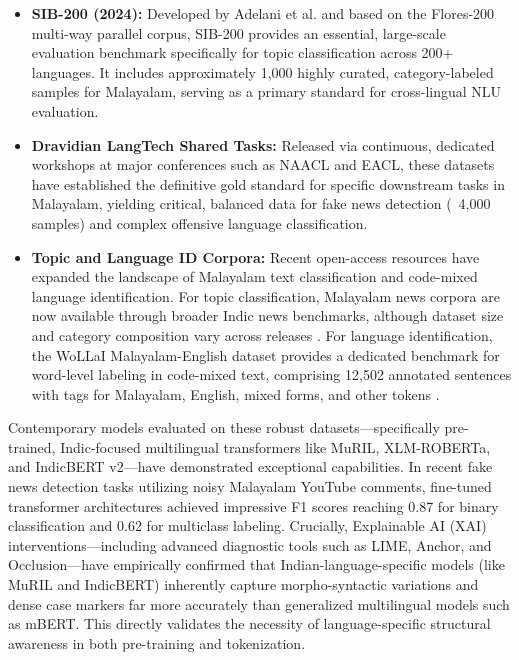 \documentclass[12pt]{article}
\begin{document}
	\begin{itemize}
		\item \textbf{SIB-200 (2024):} Developed by Adelani et al. and based on the Flores-200 multi-way parallel corpus, SIB-200 provides an essential, large-scale evaluation benchmark specifically for topic classification across 200+ languages. It includes approximately 1,000 highly curated, category-labeled samples for Malayalam, serving as a primary standard for cross-lingual NLU evaluation. \cite{adelani2023sib200}
		
		\item \textbf{Dravidian LangTech Shared Tasks:} Released via continuous, dedicated workshops at major conferences such as NAACL and EACL, these datasets have established the definitive gold standard for specific downstream tasks in Malayalam, yielding critical, balanced data for fake news detection (~4,000 samples)\cite{farsi2024dravidian_fakenews_dataset} and complex offensive language classification.\cite{dravidianlangtech2024_fakenews} 
		
		\item \textbf{Topic and Language ID Corpora:} Recent open-access resources have expanded the landscape of Malayalam text classification and code-mixed language identification. For topic classification, Malayalam news corpora are now available through broader Indic news benchmarks, although dataset size and category composition vary across releases \cite{palanikumar2024l3cubeindicnews}. For language identification, the WoLLaI Malayalam-English dataset provides a dedicated benchmark for word-level labeling in code-mixed text, comprising 12{,}502 annotated sentences with tags for Malayalam, English, mixed forms, and other tokens \cite{rijuraj2023wollai}.
	\end{itemize}
	Contemporary models evaluated on these robust datasets—specifically pre-trained, Indic-focused multilingual transformers like MuRIL, XLM-ROBERTa, and IndicBERT v2—have demonstrated exceptional capabilities. In recent fake news detection tasks utilizing noisy Malayalam YouTube comments, fine-tuned transformer architectures achieved impressive F1 scores reaching 0.87 for binary classification and 0.62 for multiclass labeling. Crucially, Explainable AI (XAI) interventions—including advanced diagnostic tools such as LIME, Anchor, and Occlusion—have empirically confirmed that Indian-language-specific models (like MuRIL and IndicBERT) inherently capture morpho-syntactic variations and dense case markers far more accurately than generalized multilingual models such as mBERT. This directly validates the necessity of language-specific structural awareness in both pre-training and tokenization. 
	
\end{document}
